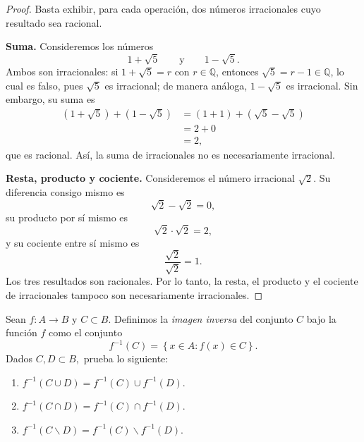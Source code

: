 \documentclass[12pt,a4paper]{article}
\begin{document}
    \begin{proof}
        Basta exhibir, para cada operación, dos números irracionales cuyo resultado sea racional.

        \textbf{Suma.} Consideremos los números
        \begin{equation*}
            1+\sqrt{5}\qquad\text{y}\qquad1-\sqrt{5}.
        \end{equation*}
        Ambos son irracionales: si $1+\sqrt{5}=r$ con $r\in\mathbb{Q}$, entonces $\sqrt{5}=r-1\in\mathbb{Q}$, lo cual es falso, pues $\sqrt{5}$ es irracional; de manera análoga, $1-\sqrt{5}$ es irracional. Sin embargo, su suma es
        \begin{align*}
            (1+\sqrt{5})+(1-\sqrt{5})&=(1+1)+(\sqrt{5}-\sqrt{5})\\
            &=2+0\\
            &=2,
        \end{align*}
        que es racional. Así, la suma de irracionales no es necesariamente irracional.

        \textbf{Resta, producto y cociente.} Consideremos el número irracional $\sqrt{2}$. Su diferencia consigo mismo es
        \begin{equation*}
            \sqrt{2}-\sqrt{2}=0,
        \end{equation*}
        su producto por sí mismo es
        \begin{equation*}
            \sqrt{2}\cdot\sqrt{2}=2,
        \end{equation*}
        y su cociente entre sí mismo es
        \begin{equation*}
            \frac{\sqrt{2}}{\sqrt{2}}=1.
        \end{equation*}
        Los tres resultados son racionales. Por lo tanto, la resta, el producto y el cociente de irracionales tampoco son necesariamente irracionales.
    \end{proof}

    \begin{problema}
        Sean $f:A\rightarrow B$ y $C\subset B.$ Definimos la \textit{imagen
        inversa}  del
        conjunto $C$ bajo la función $f$ como el conjunto 
        \begin{equation*}
            f^{-1}\left(C\right)=\left\{ x\in A:f\left(x\right)\in C\right\} .
        \end{equation*}
        Dados $C,D\subset B,$ prueba lo siguiente:
        \begin{enumerate}
            \item[(a)] $f^{-1}\left(C\cup D\right)=f^{-1}\left(C\right)\cup f^{-1}\left(D\right).$
            \item[(b)] $f^{-1}\left(C\cap D\right)=f^{-1}\left(C\right)\cap f^{-1}\left(D\right).$ 
            \item[(c)] $f^{-1}\left(C\backslash D\right)=f^{-1}\left(C\right)\backslash f^{-1}\left(D\right).$
        \end{enumerate}
    \end{problema}
\end{document}
